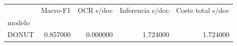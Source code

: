\begin{tabular}{lrrrr}
\toprule
 & Macro-F1 & OCR s/doc & Inferencia s/doc & Coste total s/doc \\
modelo &  &  &  &  \\
\midrule
DONUT & 0.857000 & 0.000000 & 1.724000 & 1.724000 \\
\bottomrule
\end{tabular}
